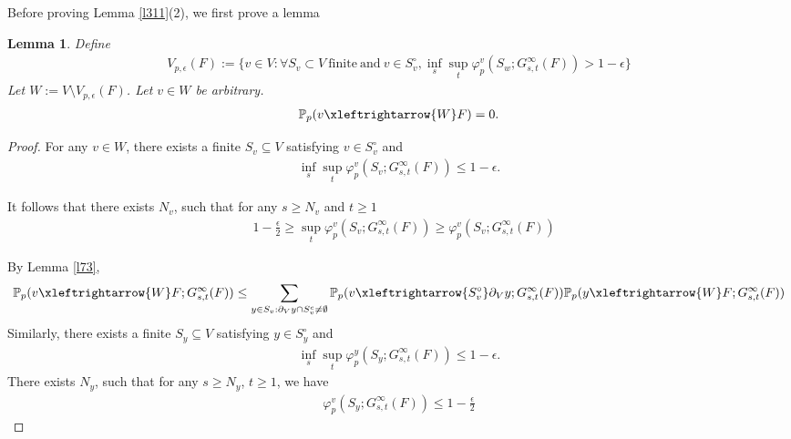 \documentclass[11pt]{amsart}
\theoremstyle{plain}
\newtheorem{lemma}[theorem]{Lemma}
\numberwithin{equation}{section}
\numberwithin{figure}{section}
\newcommand\PP{{\mathbb P}}
\begin{document}
Before proving Lemma \ref{l311}(2), we first prove a lemma
\begin{lemma}\label{l37}
Define
\begin{align}
V_{p,\epsilon}(F):=\{v\in V:\forall S_v\subset V\ \mathrm{finite\ and}\ v\in S_v^{\circ},\inf_s\sup_t\varphi_p^{v}(S_w;G_{s,t}^{\infty}(F))> 1-\epsilon\}\label{dve}
\end{align}
Let $W:=V\setminus V_{p,\epsilon}(F)$.
 Let $v\in W$ be arbitrary.
\begin{align}
\PP_{p}(v\xleftrightarrow{W}F)=0.\label{p10}
\end{align}
\end{lemma}
\begin{proof}
For any $v\in W$, there exists a finite $S_v\subseteq V$ satisfying $v\in S_v^{\circ}$ and 
\begin{align*}
\inf_{s}\sup_{t}\varphi_{p}^v(S_v;G_{s,t}^{\infty}(F))\leq 1-\epsilon.
\end{align*}

It follows that there exists $N_v$, such that for any $s\geq N_v$ and $t\geq 1$
\begin{align*}
 &1-\frac{\epsilon}{2}
\geq\sup_{t}\varphi_{p}^v(S_v;G_{s,t}^{\infty}(F))\geq  \varphi_{p}^v(S_v;G_{s,t}^{\infty}(F))
\end{align*}

By Lemma \ref{l73},
\begin{align*}
    \mathbb{P}_{p}(v\xleftrightarrow{W} F;G_{s,t}^{\infty}(F))\leq \sum_{y\in S_v:\partial_V y\cap S_v^{c}\neq \emptyset}\mathbb{P}_{p}(v\xleftrightarrow{S_v^{\circ}}\partial_V y;G_{s,t}^{\infty}(F))\mathbb{P}_{p}(y\xleftrightarrow{W} F;G_{s,t}^{\infty}(F))
\end{align*}
Similarly, there exists a finite $S_y\subseteq V$ satisfying $y\in S_y^{\circ}$ and 
\begin{align*}
\inf_s\sup_t\varphi_{p}^y(S_y;G_{s,t}^{\infty}(F))\leq 1-\epsilon.
\end{align*}
There exists $N_y$, such that for any $s\geq N_y$, $t\geq 1$, we have
\begin{align*}\varphi_{p}^v(S_y;G_{s,t}^{\infty}(F))\leq 1-\frac{\epsilon}{2}
\end{align*}


\end{proof}
\end{document}
